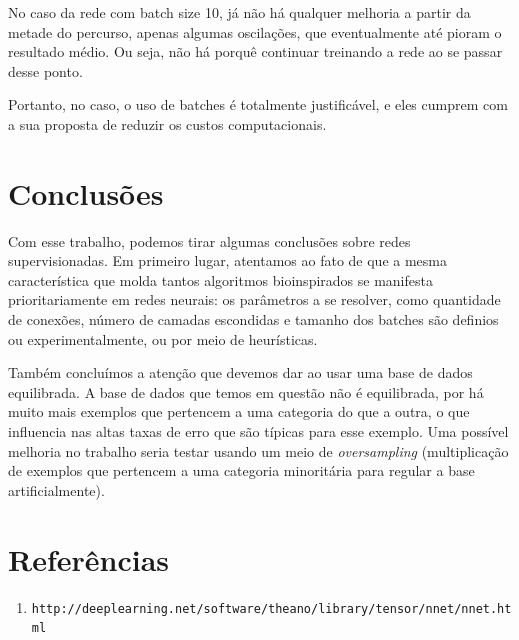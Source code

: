 \documentclass[11pt]{article}
\begin{document}
No caso da rede com batch size 10, já não há qualquer melhoria a partir da metade do percurso, apenas algumas oscilações, que eventualmente até pioram o resultado médio. Ou seja, não há porquê continuar treinando a rede ao se passar desse ponto.

Portanto, no caso, o uso de batches é totalmente justificável, e eles cumprem com a sua proposta de reduzir os custos computacionais.

\section{Conclusões}

Com esse trabalho, podemos tirar algumas conclusões sobre redes supervisionadas. Em primeiro lugar, atentamos ao fato de que a mesma característica que molda tantos algoritmos bioinspirados se manifesta prioritariamente em redes neurais: os parâmetros a se resolver, como quantidade de conexões, número de camadas escondidas e tamanho dos batches são definios ou experimentalmente, ou por meio de heurísticas.

Também concluímos a atenção que devemos dar ao usar uma base de dados equilibrada. A base de dados que temos em questão não é equilibrada, por há muito mais exemplos que pertencem a uma categoria do que a outra, o que influencia nas altas taxas de erro que são típicas para esse exemplo. Uma possível melhoria no trabalho seria testar usando um meio de \textit{oversampling} (multiplicação de exemplos que pertencem a uma categoria minoritária para regular a base artificialmente).

\section{Referências}

\begin{enumerate}
	\item \texttt{http://deeplearning.net/software/theano/library/tensor/nnet/nnet.html}
\end{enumerate}
\end{document}
